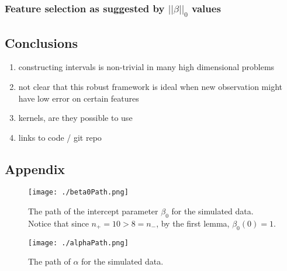 \documentclass[10pt]{article}
\theoremstyle{definition}
\begin{document}
\subsubsection{Feature selection as suggested by $||\beta||_0$ values}



\subsection{Conclusions}
\begin{enumerate}
\item constructing intervals is non-trivial in many high dimensional problems
\item not clear that this robust framework is ideal when new observation might have low error on certain features
\item kernels, are they possible to use
\item links to code / git repo
\end{enumerate}


\subsection{Appendix}
\begin{center}
\begin{figure}[!h]
   \centering
   \texttt{[image: ./beta0Path.png]} 
      \caption{The path of the intercept parameter $\beta_0$ for the simulated data. Notice that since $n_+=10>8=n_-$, by the first lemma, $\beta_0(0)=1$.}
   \label{fig:beta0Path}
\end{figure}
\end{center}

\begin{center}
\begin{figure}[!h]
   \centering
   \texttt{[image: ./alphaPath.png]} 
      \caption{The path of $\alpha$ for the simulated data.}
   \label{fig:alphaPath}
\end{figure}
\end{center}




\end{document}

